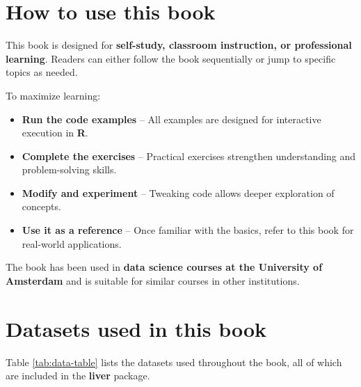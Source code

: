 \documentclass[
]{book}
\providecommand{\tightlist}{%
  \setlength{\itemsep}{0pt}\setlength{\parskip}{0pt}}
\theoremstyle{definition}
\theoremstyle{definition}
\theoremstyle{definition}
\theoremstyle{definition}
\theoremstyle{remark}
\begin{document}
\section*{How to use this book}\label{how-to-use-this-book}

This book is designed for \textbf{self-study, classroom instruction, or professional learning}. Readers can either follow the book sequentially or jump to specific topics as needed.

To maximize learning:

\begin{itemize}
\tightlist
\item
  \textbf{Run the code examples} -- All examples are designed for interactive execution in \textbf{R}.\\
\item
  \textbf{Complete the exercises} -- Practical exercises strengthen understanding and problem-solving skills.\\
\item
  \textbf{Modify and experiment} -- Tweaking code allows deeper exploration of concepts.\\
\item
  \textbf{Use it as a reference} -- Once familiar with the basics, refer to this book for real-world applications.
\end{itemize}

The book has been used in \textbf{data science courses at the University of Amsterdam} and is suitable for similar courses in other institutions.

\section*{Datasets used in this book}\label{datasets-used-in-this-book}

Table \ref{tab:data-table} lists the datasets used throughout the book, all of which are included in the \textbf{liver} package.
\end{document}
